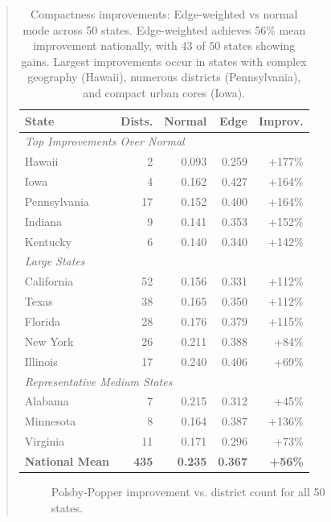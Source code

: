 \documentclass[11pt,twocolumn]{article}
\begin{document}
\begin{abstract}
\begin{table}[h]
\centering
\small
\begin{tabular}{lrrrr}
\toprule
State & Dists. & Normal & Edge & Improv. \\
\midrule
\multicolumn{5}{l}{\textit{Top Improvements Over Normal}} \\
Hawaii & 2 & 0.093 & 0.259 & +177\% \\
Iowa & 4 & 0.162 & 0.427 & +164\% \\
Pennsylvania & 17 & 0.152 & 0.400 & +164\% \\
Indiana & 9 & 0.141 & 0.353 & +152\% \\
Kentucky & 6 & 0.140 & 0.340 & +142\% \\
\midrule
\multicolumn{5}{l}{\textit{Large States}} \\
California & 52 & 0.156 & 0.331 & +112\% \\
Texas & 38 & 0.165 & 0.350 & +112\% \\
Florida & 28 & 0.176 & 0.379 & +115\% \\
New York & 26 & 0.211 & 0.388 & +84\% \\
Illinois & 17 & 0.240 & 0.406 & +69\% \\
\midrule
\multicolumn{5}{l}{\textit{Representative Medium States}} \\
Alabama & 7 & 0.215 & 0.312 & +45\% \\
Minnesota & 8 & 0.164 & 0.387 & +136\% \\
Virginia & 11 & 0.171 & 0.296 & +73\% \\
\midrule
\textbf{National Mean} & \textbf{435} & \textbf{0.235} & \textbf{0.367} & \textbf{+56\%} \\
\bottomrule
\end{tabular}
\caption{Compactness improvements: Edge-weighted vs normal mode across 50 states. Edge-weighted achieves 56\% mean improvement nationally, with 43 of 50 states showing gains. Largest improvements occur in states with complex geography (Hawaii), numerous districts (Pennsylvania), and compact urban cores (Iowa).}
\label{tab:50-state-results}
\end{table}

\begin{figure}[h]
\centering
\caption{Polsby-Popper improvement vs. district count for all 50 states.}
\label{fig:national-scatter}
\end{figure}


\end{abstract}
\end{document}
